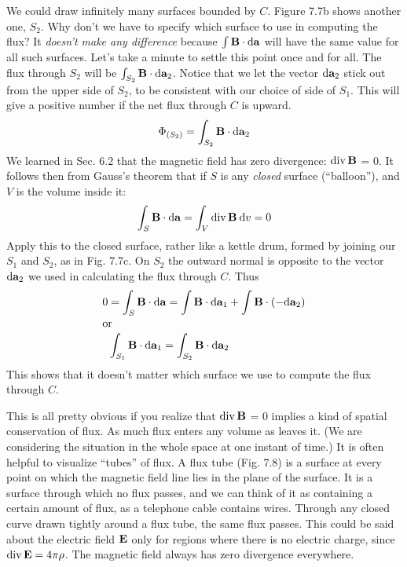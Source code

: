 We could draw infinitely many surfaces bounded by $C$. Figure 7.7b
shows another one, $S_2$. Why don't we have to specify which surface
to use in computing the flux? It \emph{doesn't make any difference} because
$\int\mathbf{B}\cdot\textup{d}\mathbf{a}$ will have the same value for all such surfaces. Let's take a
minute to settle this point once and for all. The flux through $S_2$ will
be $\int_{S_2} \mathbf{B}\cdot\textup{d}\mathbf{a}_2$. Notice that we let the vector $\textup{d}\mathbf{a}_2$ stick out from the
upper side of $S_2$, to be consistent with our choice of side of $S_1$. This
will give a positive number if the net flux through $C$ is upward.
\begin{equation}
  \Phi_{(S_2)} = \int_{S_2} \mathbf{B}\cdot\textup{d}\mathbf{a}_2
\end{equation}
We learned in Sec. 6.2 that the magnetic field has zero divergence:
$\operatorname{div}\mathbf{B}$ = 0. It follows then from Gauss's theorem that if $S$ is any
\emph{closed} surface (``balloon''), and $V$ is the volume inside it:
\begin{equation}
  \int_S \mathbf{B}\cdot\textup{d}\mathbf{a} = \int_V \operatorname{div}\mathbf{B}\:\textup{d} v = 0
\end{equation}
Apply this to the closed surface, rather like a kettle drum, formed by
joining our $S_1$ and $S_2$, as in Fig. 7.7c. On $S_2$ the outward normal is
opposite to the vector $\textup{d}\mathbf{a}_2$ we used in calculating the flux through $C$.
Thus
\begin{align}
\begin{split}
  0 &= \int_S \mathbf{B}\cdot\textup{d}\mathbf{a} = \int \mathbf{B}\cdot\textup{d}\mathbf{a}_1+\int \mathbf{B}\cdot(-\textup{d}\mathbf{a}_2) \\
\intertext{or}
    & \int_{S_1} \mathbf{B}\cdot\textup{d}\mathbf{a}_1 =   \int_{S_2} \mathbf{B}\cdot\textup{d}\mathbf{a}_2
\end{split}
\end{align}
This shows that it doesn't matter which surface we use to compute
the flux through $C$.

This is all pretty obvious if you realize that $\operatorname{div}\mathbf{B}$ = 0 implies a
kind of spatial conservation of flux. As much flux enters any volume
as leaves it. (We are considering the situation in the whole space at
one instant of time.) It is often helpful to visualize ``tubes'' of flux.
A flux tube (Fig. 7.8) is a surface at every point on which the magnetic
field line lies in the plane of the surface. It is a surface through
which no flux passes, and we can think of it as containing a certain
amount of flux, as a telephone cable contains wires. Through any
closed curve drawn tightly around a flux tube, the same flux passes.
This could be said about the electric field $\mathbf{E}$ only for regions where
there is no electric charge, since $\operatorname{div}\mathbf{E} = 4\pi\rho$. The magnetic field
always has zero divergence everywhere.


